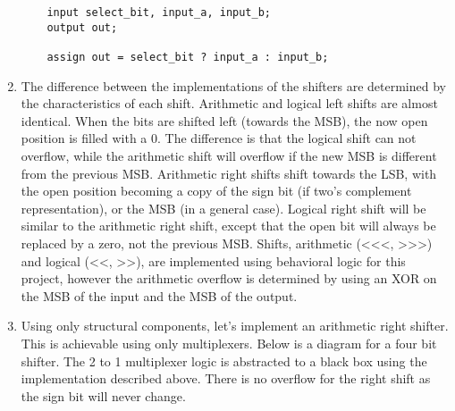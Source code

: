 \documentclass[11pt]{article}
\begin{document}
\begin{enumerate}
	\begin{lstlisting}
	input select_bit, input_a, input_b;
	output out;
	
	assign out = select_bit ? input_a : input_b;
	\end{lstlisting}
	
	\item The difference between the implementations of the shifters are determined by the characteristics of each shift. Arithmetic and logical left shifts are almost identical. When the bits are shifted left (towards the MSB), the now open position is filled with a 0. The difference is that the logical shift can not overflow, while the arithmetic shift will overflow if the new MSB is different from the previous MSB. Arithmetic right shifts shift towards the LSB, with the open position becoming a copy of the sign bit (if two's complement representation), or the MSB (in a general case). Logical right shift will be similar to the arithmetic right shift, except that the open bit will always be replaced by a zero, not the previous MSB. Shifts, arithmetic (<<<, >>>) and logical (<<, >>), are implemented using behavioral logic for this project, however the arithmetic overflow is determined by using an XOR on the MSB of the input and the MSB of the output. 
	
	\item Using only structural components, let's implement an arithmetic right shifter. This is achievable using only multiplexers. Below is a diagram for a four bit shifter. The 2 to 1 multiplexer logic is abstracted to a black box using the implementation described above. There is no overflow for the right shift as the sign bit will never change.
	
\end{enumerate}
\end{document}
